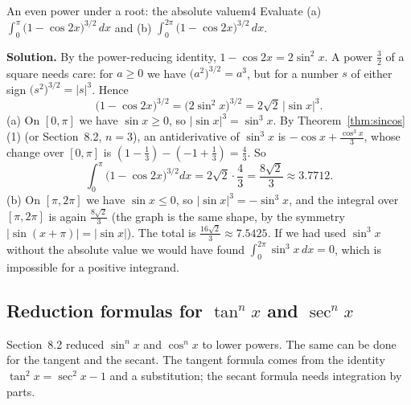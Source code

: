 \documentclass[11pt]{article}
\begin{document}
\begin{exmp}{An even power under a root: the absolute value}{m4}
Evaluate (a) $\displaystyle\int_0^{\pi}\big(1-\cos2x\big)^{3/2}\,dx$ and (b) $\displaystyle\int_0^{2\pi}\big(1-\cos2x\big)^{3/2}\,dx$.

\textbf{Solution.} By the power-reducing identity, $1-\cos2x=2\sin^2x$. A power $\frac32$ of a square needs care: for $a\ge0$ we have $\big(a^2\big)^{3/2}=a^3$, but for a number $s$ of either sign $\big(s^2\big)^{3/2}=\lvert s\rvert^3$. Hence
\[\big(1-\cos2x\big)^{3/2}=\big(2\sin^2x\big)^{3/2}=2\sqrt2\,\lvert\sin x\rvert^3 .\]
(a) On $[0,\pi]$ we have $\sin x\ge0$, so $\lvert\sin x\rvert^3=\sin^3x$. By Theorem~\ref{thm:sincos}(1) (or Section~8.2, $n=3$), an antiderivative of $\sin^3x$ is $-\cos x+\frac{\cos^3x}3$, whose change over $[0,\pi]$ is $\left(1-\frac13\right)-\left(-1+\frac13\right)=\frac43$. So
\[\int_0^\pi\big(1-\cos2x\big)^{3/2}dx=2\sqrt2\cdot\frac43=\frac{8\sqrt2}3\approx3.7712 .\]
(b) On $[\pi,2\pi]$ we have $\sin x\le0$, so $\lvert\sin x\rvert^3=-\sin^3x$, and the integral over $[\pi,2\pi]$ is again $\frac{8\sqrt2}3$ (the graph is the same shape, by the symmetry $\lvert\sin(x+\pi)\rvert=\lvert\sin x\rvert$). The total is $\frac{16\sqrt2}3\approx7.5425$. If we had used $\sin^3x$ without the absolute value we would have found $\int_0^{2\pi}\sin^3x\,dx=0$, which is impossible for a positive integrand.
\end{exmp}

\subsection*{Reduction formulas for $\tan^nx$ and $\sec^nx$}

Section~8.2 reduced $\sin^nx$ and $\cos^nx$ to lower powers. The same can be done for the tangent and the secant. The tangent formula comes from the identity $\tan^2x=\sec^2x-1$ and a substitution; the secant formula needs integration by parts.
\end{document}
